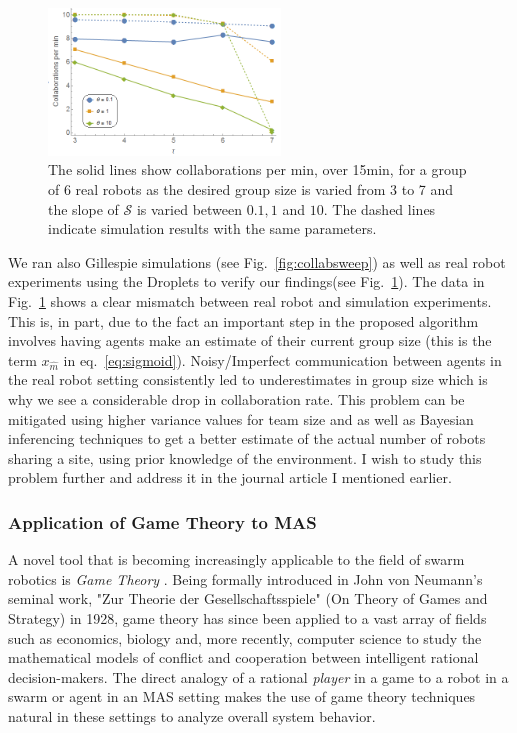 \documentclass[11pt, onecolumn, compsoc, letterpaper]{article}
\newcommand{\sig}{\mathcal{S}}
\newcommand{\xm}{x_{\hat{m}}}
\begin{document}
\begin{figure}[!htb]
\centering\includegraphics[width=0.55\textwidth]{../assets/realsimexpnew.png}
\caption{The solid lines show collaborations per min, over 15min, for a group of 6 real robots as the desired group size is varied from 3 to 7 and the slope of $\sig$ is varied between $0.1, 1$ and $10$. The dashed lines indicate simulation results with the same parameters.\label{fig:expdat} }
\end{figure}

We ran also Gillespie simulations \cite{Gillespie1976, Gillespie1977} (see Fig.~\ref{fig:collabsweep}) as well as real robot experiments using the Droplets to verify our findings(see Fig.~\ref{fig:expdat}). The data in Fig.~\ref{fig:expdat} shows a clear mismatch between real robot and simulation experiments. This is, in part, due to the fact an important step in the proposed algorithm involves having agents make an estimate of their current group size (this is the term $\xm$ in eq.~\ref{eq:sigmoid}). Noisy/Imperfect communication between agents in the real robot setting consistently led to underestimates in group size which is why we see a considerable drop in collaboration rate. This problem can be mitigated using higher variance values for team size and as well as Bayesian inferencing techniques to get a better estimate of the actual number of robots sharing a site, using prior knowledge of the environment. I wish to study this problem further and address it in the journal article I mentioned earlier.

\subsubsection{Application of Game Theory to MAS}
A novel tool that is becoming increasingly applicable to the field of swarm robotics is \emph{Game Theory} \cite{GivigiJr2006, Panait2005}. Being formally introduced in John von Neumann's seminal work, "Zur Theorie der Gesellschaftsspiele" (On Theory of Games and Strategy) in 1928, game theory has since been applied to a vast array of fields such as economics, biology and, more recently, computer science to study the mathematical models of conflict and cooperation between intelligent rational decision-makers. The direct analogy of  a rational \emph{player} in a game to a robot in a swarm or agent in an MAS setting makes the use of game theory techniques natural in these settings to analyze overall system behavior.
\end{document}
